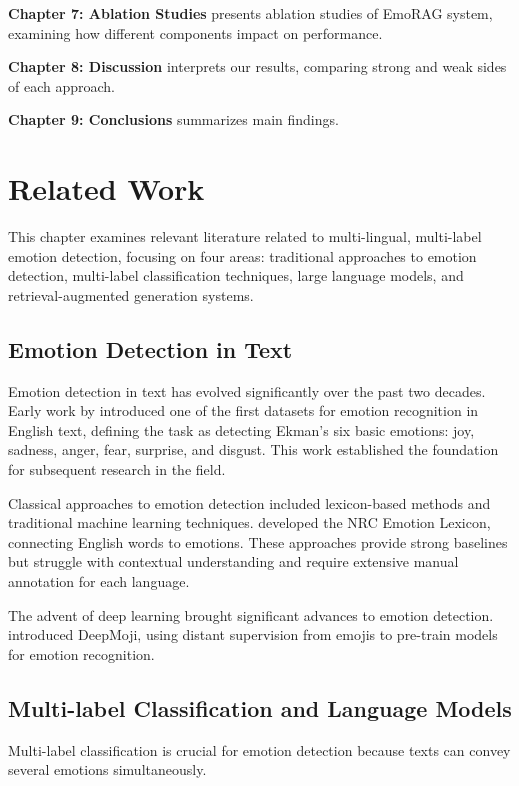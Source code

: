 \documentclass[a4paper,12pt]{extarticle}
\begin{document}
\textbf{Chapter 7: Ablation Studies} presents ablation studies of EmoRAG system, examining how different components impact on performance.

\textbf{Chapter 8: Discussion} interprets our results, comparing strong and weak sides of each approach.

\textbf{Chapter 9: Conclusions} summarizes main findings.

\section{Related Work}

This chapter examines relevant literature related to multi-lingual, multi-label emotion detection, focusing on four areas: traditional approaches to emotion detection, multi-label classification techniques, large language models, and retrieval-augmented generation systems.

\subsection{Emotion Detection in Text}

Emotion detection in text has evolved significantly over the past two decades. Early work by \cite{strapparava2007semeval} introduced one of the first datasets for emotion recognition in English text, defining the task as detecting Ekman's six basic emotions: joy, sadness, anger, fear, surprise, and disgust. This work established the foundation for subsequent research in the field.

Classical approaches to emotion detection included lexicon-based methods and traditional machine learning techniques. \cite{mohammad2013crowdsourcing} developed the NRC Emotion Lexicon, connecting English words to emotions. These approaches provide strong baselines but struggle with contextual understanding and require extensive manual annotation for each language.

The advent of deep learning brought significant advances to emotion detection. \cite{felbo2017using} introduced DeepMoji, using distant supervision from emojis to pre-train models for emotion recognition.

\subsection{Multi-label Classification and Language Models}

Multi-label classification is crucial for emotion detection because texts can convey several emotions simultaneously. 
\end{document}
